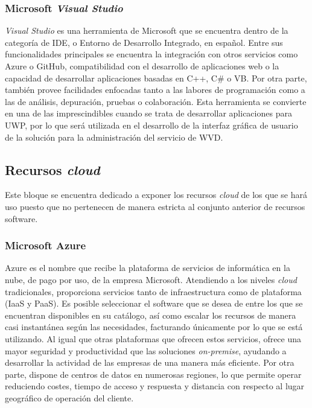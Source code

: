 \subsubsection{Microsoft \textit{Visual Studio}}
\textit{Visual Studio} \cite{visualstudio} es una herramienta de Microsoft que se encuentra dentro de la categoría de \acf{IDE}, o Entorno de Desarrollo Integrado, en español. Entre sus funcionalidades principales se encuentra la integración con otros servicios como Azure o GitHub, compatibilidad con el desarrollo de aplicaciones web o la capacidad de desarrollar aplicaciones basadas en C++, C\# o \acf{VB}. Por otra parte, también provee facilidades enfocadas tanto a las labores de programación como a las de análisis, depuración, pruebas o colaboración. Esta herramienta se convierte en una de las imprescindibles cuando se trata de desarrollar aplicaciones para \acf{UWP}, por lo que será utilizada en el desarrollo de la interfaz gráfica de usuario de la solución para la administración del servicio de \acf{WVD}.

\clearpage

\subsection{Recursos \textit{cloud}}
Este bloque se encuentra dedicado a exponer los recursos \textit{cloud} de los que se hará uso puesto que no pertenecen de manera estricta al conjunto anterior de recursos software.

\subsubsection{Microsoft Azure}
Azure \cite{queesazure} es el nombre que recibe la plataforma de servicios de informática en la nube, de pago por uso, de la empresa Microsoft. Atendiendo a los niveles \textit{cloud} tradicionales, proporciona servicios tanto de infraestructura como de plataforma (\acs{IaaS} y \acs{PaaS}). Es posible seleccionar el software que se desea de entre los que se encuentran disponibles en su catálogo, así como escalar los recursos de manera casi instantánea según las necesidades, facturando únicamente por lo que se está utilizando. Al igual que otras plataformas que ofrecen estos servicios, ofrece una mayor seguridad y productividad que las soluciones \textit{on-premise}, ayudando a desarrollar la actividad de las empresas de una manera más eficiente. Por otra parte, dispone de centros de datos en numerosas regiones, lo que permite operar reduciendo costes, tiempo de acceso y respuesta y distancia con respecto al lugar geográfico de operación del cliente.

